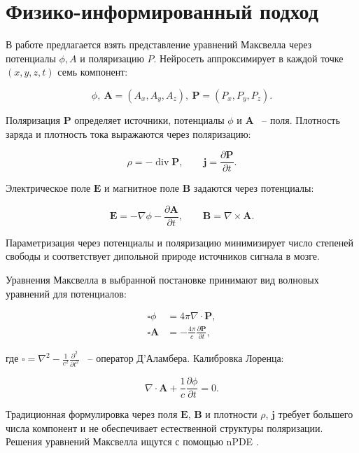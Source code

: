\documentclass[a4paper,14pt,oneside,openany]{extarticle}
\begin{document}
\newpage
\section{Физико-информированный подход}
В работе предлагается взять представление уравнений Максвелла 
через потенциалы $\phi, A$ и поляризацию $P$. Нейросеть аппроксимирует в каждой точке $(x,y,z,t)$ семь компонент:

\[\phi,\ \mathbf{A} = (A_x, A_y, A_z),\ \mathbf{P} = (P_x, P_y, P_z).\]

Поляризация $\mathbf{P}$ определяет источники, потенциалы $\phi$ и $\mathbf{A}$ ~-- поля. 
Плотность заряда и плотность тока выражаются через поляризацию:

\begin{equation}
    \rho = -\operatorname{div} \mathbf{P},
    \qquad
    \mathbf{j} = \frac{\partial \mathbf{P}}{\partial t}.
\end{equation}

Электрическое поле $\mathbf{E}$ и магнитное поле $\mathbf{B}$ задаются через потенциалы:

\begin{equation}
    \mathbf{E} = -\nabla \phi - \frac{\partial \mathbf{A}}{\partial t},
    \qquad
    \mathbf{B} = \nabla \times \mathbf{A}.
\end{equation}

Параметризация через потенциалы и поляризацию минимизирует число степеней свободы и 
соответствует дипольной природе источников сигнала в мозге.

Уравнения Максвелла в выбранной постановке принимают вид волновых уравнений для потенциалов:

\begin{align}
    \square \phi &= 4\pi \nabla \cdot \mathbf{P}, \label{eq:wave_phi} \\
    \square \mathbf{A} &= -\frac{4\pi}{c} \frac{\partial \mathbf{P}}{\partial t}, \label{eq:wave_A}
\end{align}

где $\square = \nabla^2 - \frac{1}{c^2} \frac{\partial^2}{\partial t^2}$ ~-- оператор Д’Аламбера. 
Калибровка Лоренца:

\begin{equation}
    \nabla \cdot \mathbf{A} + \frac{1}{c} \frac{\partial \phi}{\partial t} = 0.
\end{equation}

Традиционная формулировка через поля $\mathbf{E}$, $\mathbf{B}$ и плотности $\rho$, $\mathbf{j}$ 
требует большего числа компонент и не обеспечивает естественной структуры поляризации. Решения уравнений Максвелла ищутся с помощью nPDE \cite{Zubov2021}.
\end{document}
